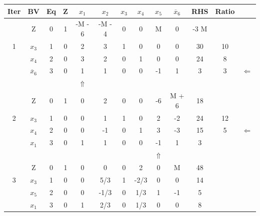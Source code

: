 \documentclass[12pt]{article}
\begin{document}
\begin{center}
\begin{tabular}{|c|c|c|c|cccccc|c|c|c|}
\hline
 Iter  &  BV                &  Eq  &  Z  &       $x_1$  &   $x_2$  &  $x_3$  &  $x_4$  &       $x_5$  &  $\overline{x}_6$  &   RHS  &  Ratio  &                \\
\hline
       &  Z                 &   0  &  1  &      -M - 6  &  -M - 4  &      0  &      0  &           M  &                 0  &  -3 M  &         &                \\
    1  &  $x_3$             &   1  &  0  &           2  &       3  &      1  &      0  &           0  &                 0  &    30  &     10  &                \\
       &  $x_4$             &   2  &  0  &           3  &       2  &      0  &      1  &           0  &                 0  &    24  &      8  &                \\
       &  $\overline{x}_6$  &   3  &  0  &           1  &       1  &      0  &      0  &          -1  &                 1  &     3  &      3  &  $\Leftarrow$  \\
\hline
       &                    &      &     &  $\Uparrow$  &          &         &         &              &                    &        &         &                \\
\hline
       &  Z                 &   0  &  1  &           0  &       2  &      0  &      0  &          -6  &             M + 6  &    18  &         &                \\
    2  &  $x_3$             &   1  &  0  &           0  &       1  &      1  &      0  &           2  &                -2  &    24  &     12  &                \\
       &  $x_4$             &   2  &  0  &           0  &      -1  &      0  &      1  &           3  &                -3  &    15  &      5  &  $\Leftarrow$  \\
       &  $x_1$             &   3  &  0  &           1  &       1  &      0  &      0  &          -1  &                 1  &     3  &         &                \\
\hline
       &                    &      &     &              &          &         &         &  $\Uparrow$  &                    &        &         &                \\
\hline
       &  Z                 &   0  &  1  &           0  &       0  &      0  &      2  &           0  &                 M  &    48  &         &                \\
    3  &  $x_3$             &   1  &  0  &           0  &     5/3  &      1  &   -2/3  &           0  &                 0  &    14  &         &                \\
       &  $x_5$             &   2  &  0  &           0  &    -1/3  &      0  &    1/3  &           1  &                -1  &     5  &         &                \\
       &  $x_1$             &   3  &  0  &           1  &     2/3  &      0  &    1/3  &           0  &                 0  &     8  &         &                \\
\hline
\end{tabular}
\end{center}
\end{document}
